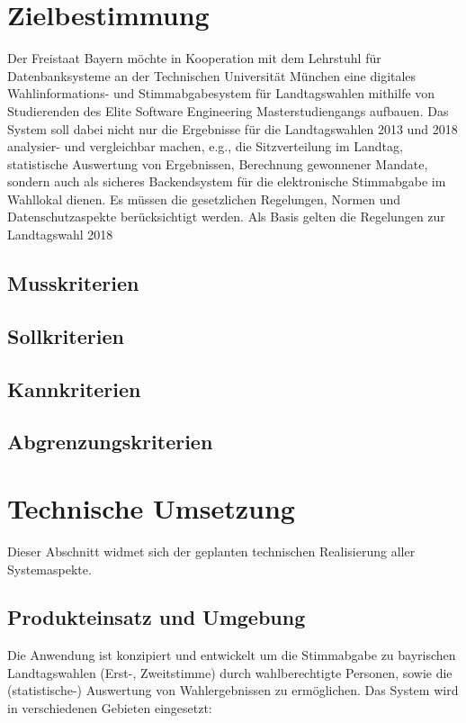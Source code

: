 \documentclass[a4paper,12pt]{article}
\begin{document}
 \setcounter{page}{2}

 \tableofcontents          %
 \clearpage
 
\section{Zielbestimmung}
Der Freistaat Bayern möchte in Kooperation mit dem Lehrstuhl für 
Datenbanksysteme an der Technischen Universität München eine digitales 
Wahlinformations- und Stimmabgabesystem für Landtagswahlen mithilfe von 
Studierenden des Elite Software Engineering Masterstudiengangs aufbauen.
%
Das System soll dabei nicht nur die Ergebnisse für die Landtagswahlen 
2013 und 2018 analysier- und vergleichbar machen, e.g., die Sitzverteilung 
im Landtag, statistische Auswertung von Ergebnissen, Berechnung gewonnener
Mandate, sondern auch als sicheres Backendsystem für die elektronische 
Stimmabgabe im Wahllokal dienen. 
%
Es müssen die gesetzlichen Regelungen, Normen und Datenschutzaspekte
berücksichtigt werden. Als Basis gelten die Regelungen zur
Landtagswahl 2018


\subsection{Musskriterien}
\subsection{Sollkriterien}
\subsection{Kannkriterien}
\subsection{Abgrenzungskriterien}

\section{Technische Umsetzung}
Dieser Abschnitt widmet sich der geplanten technischen Realisierung
aller Systemaspekte.

\subsection{Produkteinsatz und Umgebung}
Die Anwendung ist konzipiert und entwickelt um die Stimmabgabe 
zu bayrischen Landtagswahlen (Erst-, Zweitstimme) durch wahlberechtigte
Personen, sowie die (statistische-) Auswertung von Wahlergebnissen zu ermöglichen. 
%
Das System wird in verschiedenen Gebieten eingesetzt:
\end{document}
